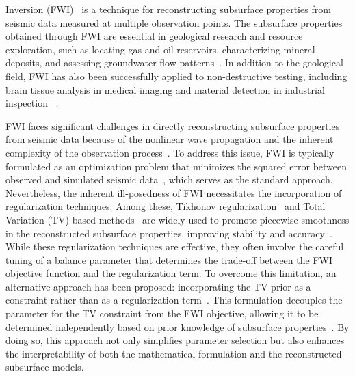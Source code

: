  Inversion (FWI)~\cite{FWI0,FWI1} is a technique for reconstructing subsurface properties from seismic data measured at multiple observation points.
The subsurface properties obtained through FWI are essential in geological research and resource exploration, such as locating gas and oil reservoirs, characterizing mineral deposits, and assessing groundwater flow patterns~\cite{FWI1,FWIApplicationGroundwater0,FWIApplicationGroundwater1}.
In addition to the geological field, FWI has also been successfully applied to non-destructive testing, including brain tissue analysis in medical imaging and material detection in industrial inspection ~\cite{FWIApplicationNonDestructiveTesting0,FWIApplicationNonDestructiveTesting1}.

FWI faces significant challenges in directly reconstructing subsurface properties from seismic data because of the nonlinear wave propagation and the inherent complexity of the observation process~\cite{FWI1}.
To address this issue, FWI is typically formulated as an optimization problem that minimizes the squared error between observed and simulated seismic data~\mbox{\cite{FWI0,CustomFWI0,CustomFWI1,CustomFWI2,CustomFWI3,CustomFWI4,CustomFWI5}}, which serves as the standard approach.
Nevertheless, the inherent ill-posedness of FWI necessitates the incorporation of regularization techniques.
Among these, Tikhonov regularization~\cite{tikhonov} and Total Variation (TV)-based methods~\cite{TV,TGV} are widely used to promote piecewise smoothness in the reconstructed subsurface properties, improving stability and accuracy~\cite{FWI-with-tikhonov-regularization,FWI-with-TV-regularization,FWI-with-directional-TV-regularization,FWI-with-high-order-TV-regularization,FWI-with-TGV-regularization}.
While these regularization techniques are effective, they often involve the careful tuning of a balance parameter that determines the trade-off between the FWI objective function and the regularization term.
To overcome this limitation, an alternative approach has been proposed: incorporating the TV prior as a constraint rather than as a regularization term~\cite{FWI-with-TV-constraint,FWI-with-TV-constraint2,FWI-with-TV-constraint3,FWI-with-TV-constraint4}.
This formulation decouples the parameter for the TV constraint from the FWI objective, allowing it to be determined independently based on prior knowledge of subsurface properties~\cite{constraint0,constraint1,constraint2,constraint3,constraint4,constraints-vs-penalties-in-FWI}.
By doing so, this approach not only simplifies parameter selection but also enhances the interpretability of both the mathematical formulation and the reconstructed subsurface models.

